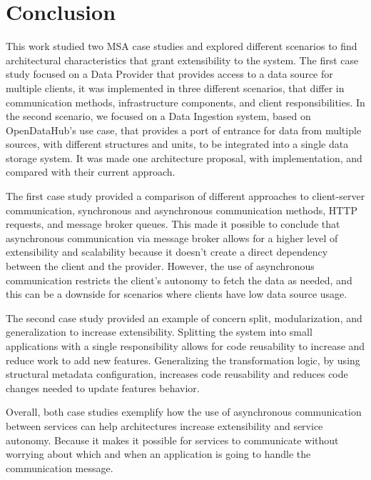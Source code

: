 \newcommand{\sla}{\textbackslash}

\newcommand{\cmd}[1]{\textsf{#1}}

\newcommand{\pkg}[1]{\textsf{#1}}

\newcommand{\ltxcmd}[1]{\cmd{\sla{}#1}}

\chapter{Conclusion}
\label{chap:conclusion}

This work studied two MSA case studies and explored different scenarios to find architectural characteristics that grant extensibility to the system. The first case study focused on a Data Provider that provides access to a data source for multiple clients, it was implemented in three different scenarios, that differ in communication methods, infrastructure components, and client responsibilities. In the second scenario, we focused on a Data Ingestion system, based on OpenDataHub's use case, that provides a port of entrance for data from multiple sources, with different structures and units, to be integrated into a single data storage system. It was made one architecture proposal, with implementation, and compared with their current approach.

The first case study provided a comparison of different approaches to client-server communication, synchronous and asynchronous communication methods, HTTP requests, and message broker queues. This made it possible to conclude that asynchronous communication via message broker allows for a higher level of extensibility and scalability because it doesn't create a direct dependency between the client and the provider. However, the use of asynchronous communication restricts the client's autonomy to fetch the data as needed, and this can be a downside for scenarios where clients have low data source usage.

The second case study provided an example of concern split, modularization, and generalization to increase extensibility. Splitting the system into small applications with a single responsibility allows for code reusability to increase and reduce work to add new features. Generalizing the transformation logic, by using structural metadata configuration, increases code reusability and reduces code changes needed to update features behavior.

Overall, both case studies exemplify how the use of asynchronous communication between services can help architectures increase extensibility and service autonomy. Because it makes it possible for services to communicate without worrying about which and when an application is going to handle the communication message.

